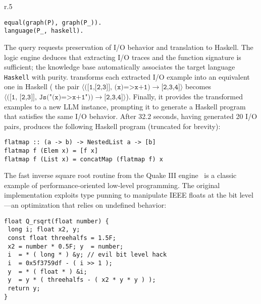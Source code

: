 \documentclass[a4paper,twoside,12pt]{report} %
\begin{document}
\begin{wrapfigure}[3]{r}{.5\columnwidth}
\vspace{-10pt}
\begin{verbatim}
equal(graph(P), graph(P_)).
language(P_, haskell).
\end{verbatim}
\end{wrapfigure}
The query requests preservation of I/O behavior and translation to Haskell. The
logic engine deduces that extracting I/O traces and the function signature is
sufficient; the knowledge base automatically associates the target language
\texttt{Haskell} with purity.
\sys transforms each extracted I/O example into an equivalent one in Haskell (\eg 
the pair $\langle\texttt{([1,[2,3]], (x)=>x+1)}\to\texttt{[2,3,4]}\rangle$ 
becomes $\langle(\texttt{[1, [2,3]], Js("(x)=>x+1"))}\to\texttt{[2,3,4]}\rangle$).
Finally, it provides the transformed examples to a new LLM instance, prompting it
to generate a Haskell program that satisfies the same I/O behavior.
After 32.2 seconds, having generated 20 I/O pairs, \sys produces the following
Haskell program (truncated for brevity):
\begin{verbatim}
flatmap :: (a -> b) -> NestedList a -> [b]
flatmap f (Elem x) = [f x]
flatmap f (List x) = concatMap (flatmap f) x
\end{verbatim}

The fast inverse square root routine from the Quake III
engine~\cite{fast_inv_sqrt}
is a classic example of performance-oriented low-level programming.
The original implementation exploits type punning to manipulate IEEE
floats at the bit level---an optimization that relies on undefined behavior:

\begin{verbatim}
float Q_rsqrt(float number) {
 long i; float x2, y;
 const float threehalfs = 1.5F;
 x2 = number * 0.5F; y  = number;
 i  = * ( long * ) &y; // evil bit level hack
 i  = 0x5f3759df - ( i >> 1 );
 y  = * ( float * ) &i;
 y  = y * ( threehalfs - ( x2 * y * y ) );
 return y;
}
\end{verbatim}
\end{document}
